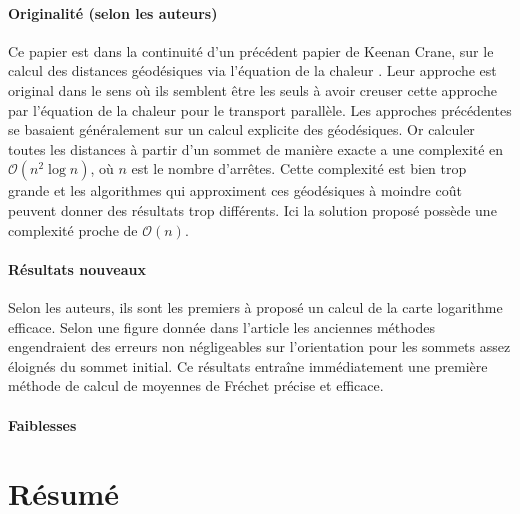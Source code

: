 \documentclass[11pt]{article}
\begin{document}
	\paragraph{Originalité (selon les auteurs)}
	Ce papier est dans la continuité d'un précédent papier de Keenan Crane, sur le calcul des distances géodésiques via l'équation de la chaleur \cite{HM}. Leur approche est original dans le sens où ils semblent être les seuls à avoir creuser cette approche par l'équation de la chaleur pour le transport parallèle. Les approches précédentes se basaient généralement sur un calcul explicite des géodésiques. Or calculer toutes les distances à partir d'un sommet de manière exacte a une complexité en $\mathcal{O}(n^2 \log n)$, où $n$ est le nombre d'arrêtes. Cette complexité est bien trop grande et les algorithmes qui approximent ces géodésiques à moindre coût peuvent donner des résultats trop différents. Ici la solution proposé possède une complexité proche de $\mathcal{O}(n)$.
	
	\paragraph{Résultats nouveaux}
	Selon les auteurs, ils sont les premiers à proposé un calcul de la carte logarithme efficace. Selon une figure donnée dans l'article les anciennes méthodes engendraient des erreurs non négligeables sur l'orientation pour les sommets assez éloignés du sommet initial. Ce résultats entraîne immédiatement une première méthode de calcul de moyennes de Fréchet précise et efficace.
	
	\paragraph{Faiblesses}
	
	\section{Résumé}
	
\end{document}
